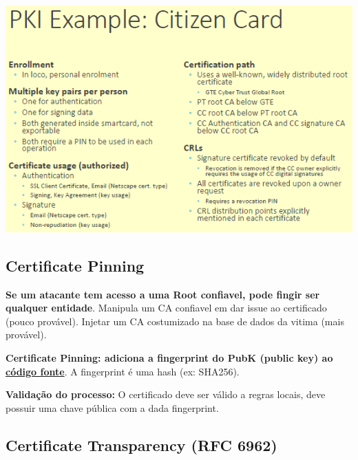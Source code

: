 \documentclass{article}
\begin{document}
\begin{center}
  \includegraphics[scale=0.6]{18}
\end{center}

\subsection{Certificate Pinning}

\begin{flushleft}
  \textbf{Se um atacante tem acesso a uma Root confiavel, pode
  fingir ser qualquer entidade}. Manipula um CA confiavel
  em dar issue ao certificado (pouco provável).
  Injetar um CA costumizado na base de dados da vitima (mais provável).

  \vspace{2mm}

  \textbf{Certificate Pinning: adiciona a fingerprint do PubK (public key)
  ao \uline{código fonte}}. A fingerprint é uma hash (ex: SHA256).

  \vspace{2mm}

  \textbf{Validação do processo:} O certificado deve ser válido a regras locais,
  deve possuir uma chave pública com a dada fingerprint.
\end{flushleft}

\subsection{Certificate Transparency (RFC 6962)}
\end{document}
